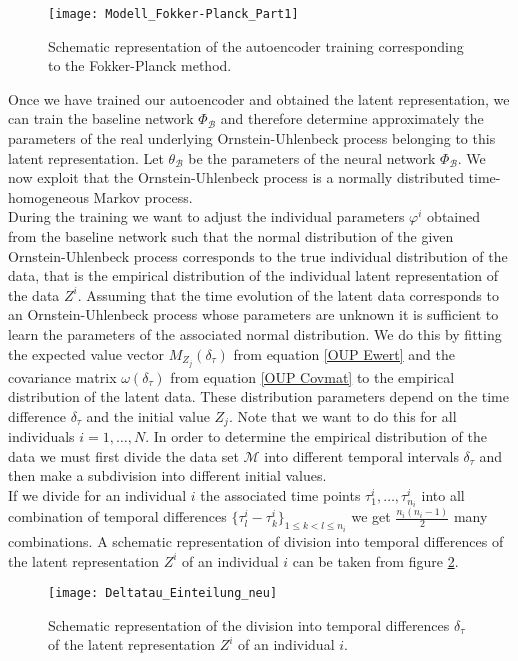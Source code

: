 \documentclass[11pt,titlepage]{article}
\theoremstyle{definition}
\theoremstyle{remark}
\begin{document}
	\begin{figure}[h!]
		\centering
		\texttt{[image: Modell\_Fokker-Planck\_Part1]}
		\caption{Schematic representation of the autoencoder training corresponding to the Fokker-Planck method.}
		\label{Abb model FP part 1}
	\end{figure}
	
	Once we have trained our autoencoder and obtained the latent representation, we can train the baseline network $\Phi_\mathcal{B}$ and therefore determine approximately the parameters of the real underlying Ornstein-Uhlenbeck process belonging to this latent representation.
	Let $\theta_\mathcal{B}$ be the parameters of the neural network $\Phi_\mathcal{B}$. We now exploit that the Ornstein-Uhlenbeck process is a normally distributed time-homogeneous Markov process. \\
	During the training we want to adjust the individual parameters $\varphi^i$ obtained from the baseline network such that the normal distribution of the given Ornstein-Uhlenbeck process corresponds to the true individual distribution of the data, that is the empirical distribution of the individual latent representation of the data $Z^i$. Assuming that the time evolution of the latent data corresponds to an Ornstein-Uhlenbeck process whose parameters are unknown it is sufficient to learn the parameters of the associated normal distribution. We do this by fitting the expected value vector $M_{Z_j}(\delta_\tau)$ from equation \ref{OUP Ewert} and the covariance matrix $\omega(\delta_\tau)$ from equation \ref{OUP Covmat} to the empirical distribution of the latent data. These distribution parameters depend on the time difference $\delta_\tau$ and the initial value $Z_j$. Note that we want to do this for all individuals $i=1,\ldots, N$. In order to determine the empirical distribution of the data we must first divide the data set $\mathcal{M}$ into different temporal intervals $\delta_\tau$ and then make a subdivision into different initial values. \\
	If we divide for an individual $i$ the associated time points $\tau^i_1,\ldots, \tau^i_{n_i}$ into all combination of temporal differences $\{\tau^i_l - \tau^i_k\}_{1\leq k <l\leq n_i}$ we get $\frac{n_i(n_i -1)}{2}$ many combinations. A schematic representation of division into temporal differences of the latent representation $Z^i$ of an individual $i$ can be taken from figure \ref{Abb Delta tau Einteilung}.
	\begin{figure}[h!]
			\centering
			\texttt{[image: Deltatau\_Einteilung\_neu]}
			\caption{Schematic representation of the division into temporal differences $\delta_\tau$ of the latent representation $Z^i$ of an individual $i$.}
			\label{Abb Delta tau Einteilung}
	\end{figure}
\end{document}
